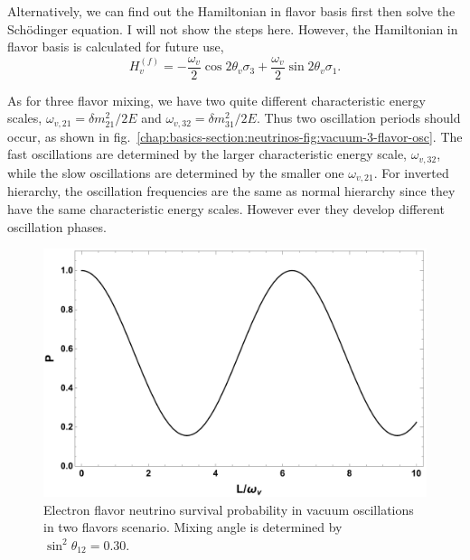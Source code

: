 Alternatively, we can find out the Hamiltonian in flavor basis first then solve the Sch\"{o}dinger equation. I will not show the steps here. However, the Hamiltonian in flavor basis is calculated for future use,
\begin{equation}
H_v^{(f)} = -\frac{\omega_v}{2}\cos 2\theta_v \sigma_3 + \frac{\omega_v}{2} \sin 2\theta_v \sigma_1.
    \label{chap:basics-sec:vacuum-osc-eqn:hamiltonian-vacuum}
\end{equation}

As for three flavor mixing, we have two quite different characteristic energy scales, $\omega_{v,21}=\delta m_{21}^2/2E$ and $\omega_{v,32}=\delta m_{31}^2/2E$. Thus two oscillation periods should occur, as shown in fig.~\ref{chap:basics-section:neutrinos-fig:vacuum-3-flavor-osc}. The fast oscillations are determined by the larger characteristic energy scale, $\omega_{v,32}$, while the slow oscillations are determined by the smaller one $\omega_{v,21}$. For inverted hierarchy, the oscillation frequencies are the same as normal hierarchy since they have the same characteristic energy scales. However ever they develop different oscillation phases.


\begin{figure}
    \centering
    \includegraphics[width=\textwidth]{chapters/assets/basics/neutrino-vaccum-osc-2-flavor.pdf}
    \caption{Electron flavor neutrino survival probability in vacuum oscillations in two flavors scenario. Mixing angle is determined by $\sin^2\theta_{12}=0.30$.}
    \label{chap:basics-section:neutrinos-fig:vacuum-2-flavor-osc}
\end{figure}



